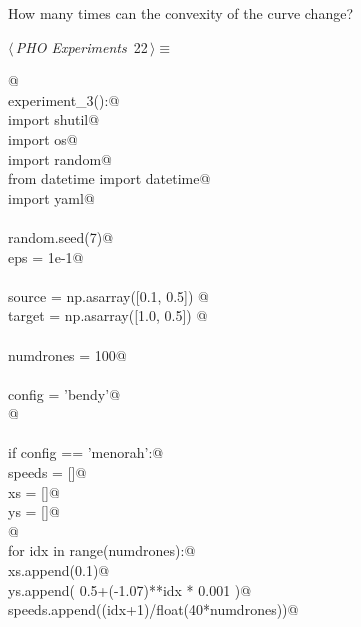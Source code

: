 \documentclass[10.0pt]{report}
\begin{document}
How many times can the convexity of the curve change? 

\begin{flushleft} \small
\begin{minipage}{\linewidth}\label{scrap11}\raggedright\small
{} $\langle\,${\itshape PHO Experiments}\nobreak\ {\footnotesize {22}}$\,\rangle\equiv$
\vspace{-1ex}
\begin{list}{}{} \item
\mbox{}\verb@  @\\
\mbox{}\verb@def experiment_3():@\\
\mbox{}\verb@    import shutil@\\
\mbox{}\verb@    import os@\\
\mbox{}\verb@    import random@\\
\mbox{}\verb@    from datetime import datetime@\\
\mbox{}\verb@    import yaml@\\
\mbox{}\verb@@\\
\mbox{}\verb@    random.seed(7)@\\
\mbox{}\verb@    eps = 1e-1@\\
\mbox{}\verb@@\\
\mbox{}\verb@    source  = np.asarray([0.1, 0.5]) @\\
\mbox{}\verb@    target  = np.asarray([1.0, 0.5]) @\\
\mbox{}\verb@@\\
\mbox{}\verb@    numdrones = 100@\\
\mbox{}\verb@@\\
\mbox{}\verb@    config = 'bendy'@\\
\mbox{}\verb@    @\\
\mbox{}\verb@@\\
\mbox{}\verb@    if config == 'menorah':@\\
\mbox{}\verb@        speeds = []@\\
\mbox{}\verb@        xs     = []@\\
\mbox{}\verb@        ys     = []@\\
\mbox{}\verb@    @\\
\mbox{}\verb@        for idx in range(numdrones):@\\
\mbox{}\verb@             xs.append(0.1)@\\
\mbox{}\verb@             ys.append( 0.5+(-1.07)**idx * 0.001 )@\\
\mbox{}\verb@             speeds.append((idx+1)/float(40*numdrones))@\\

\end{list}
\end{minipage}
\end{flushleft}
\end{document}
